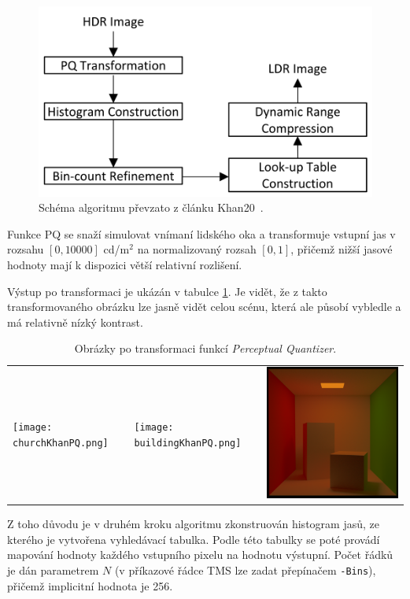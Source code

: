 \documentclass[11pt,a4paper,oneside]{article}
\begin{document}
\begin{figure}[htb]
  \begin{center}
    \includegraphics[width=0.8\linewidth]{fig/schema.png}
      \caption{Schéma algoritmu převzato z článku Khan20~\cite{Khan2020}.} 
    \label{fig:schema}
  \end{center}
\end{figure}

Funkce PQ se snaží simulovat vnímaní lidského oka a transformuje vstupní jas v
rozsahu $[0, 10000]$ cd/m$^2$ na normalizovaný rozsah $[0,1]$, přičemž nižší
jasové hodnoty mají k dispozici větší relativní rozlišení.

Výstup po transformaci je ukázán v tabulce \ref{tab:method-pq}. Je vidět, že z
takto transformovaného obrázku lze jasně vidět celou scénu, která ale působí
vybledle a má relativně nízký kontrast.

\begin{table}[htb]
    \centering
    \caption{Obrázky po transformaci funkcí \textit{Perceptual Quantizer}.}
    \label{tab:method-pq}
    \begin{tabular}{lll}
        \texttt{[image: churchKhanPQ.png]} &
        \texttt{[image: buildingKhanPQ.png]} &
        \includegraphics[width=.33\linewidth,valign=m]{cornell_boxKhanPQ.png} \\
    \end{tabular}
\end{table}

Z toho důvodu je v druhém kroku algoritmu zkonstruován histogram jasů, ze
kterého je vytvořena vyhledávací tabulka. Podle této tabulky se poté provádí
mapování hodnoty každého vstupního pixelu na hodnotu výstupní. Počet řádků je
dán parametrem $N$ (v příkazové řádce TMS lze zadat přepínačem \texttt{-Bins}),
přičemž implicitní hodnota je 256.
\end{document}
